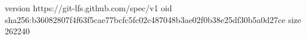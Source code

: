 version https://git-lfs.github.com/spec/v1
oid sha256:b36082807f4f63f5cae77bcfc5fc02c487048b3ae02f0b38e25df30b5a0d27ce
size 262240
